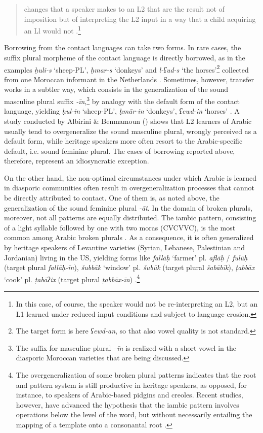 \documentclass[output=paper]{langsci/langscibook}
\begin{document}
\begin{quote}changes that a speaker makes to an L2 that are the result not of imposition but of interpreting the L2 input in a way that a child acquiring an Ll would not \citep[525]{Lucas2015}.\footnote{In this case, of course, the speaker would not be re-interpreting an L2, but an L1 learned under reduced input conditions and subject to language erosion.}\end{quote}

Borrowing from the contact languages can take two forms. In rare cases, the suffix plural morpheme of the contact language is directly borrowed, as in the examples \textit{ḥuli-s} ‘sheep-PL’, \textit{ḥmar-s} ‘donkeys’ and \textit{l-ʕud-s} ‘the horses’\footnote{The target form is here \textit{ʕewd-an}, so that also vowel quality is not standard.} collected from one Moroccan informant in the Netherlands \citep[274]{BoumansdeRuiter2002}. Sometimes, however, transfer works in a subtler way, which consists in the generalization of the sound masculine plural suffix \textit{{}-īn},\footnote{The suffix for masculine plural \textit{–īn} is realized with a short vowel in the diasporic Moroccan varieties that are being discussed.} by analogy with the default form of the contact language, yielding \textit{ḥul-in} ‘sheep-PL’, \textit{ḥmār-in} ‘donkeys’, \textit{ʕewd-in} ‘horses’ \citep[274]{BoumansdeRuiter2002}. A study conducted by Albirini \& Benmamoun (\citeyear[866–867]{AlbiriniBenmamoun2014}) shows that L2 learners of Arabic usually tend to overgeneralize the sound masculine plural, wrongly perceived as a default form, while heritage speakers more often resort to the Arabic-specific default, i.e. sound feminine plural. The cases of borrowing reported above, therefore, represent an idiosyncratic exception.

On the other hand, the non-optimal circumstances under which Arabic is learned in diasporic communities often result in overgeneralization processes that cannot be directly attributed to contact. One of them is, as noted above, the generalization of the sound feminine plural \textit{{}-āt}. In the domain of broken plurals, moreover, not all patterns are equally distributed. The iambic pattern, consisting of a light syllable followed by one with two moras (CVCVVC), is the most common among Arabic broken plurals \citep[857]{AlbiriniBenmamoun2014}. As a consequence, it is often generalized by heritage speakers of Levantine varieties (Syrian, Lebanese, Palestinian and Jordanian) living in the US, yielding forms like \textit{fallāḥ} ‘farmer’ pl. \textit{aflāḥ} / \textit{fulūḥ} (target plural \textit{fallāḥ-īn}), \textit{šubbāk} ‘window’ pl. \textit{šubūk} (target plural \textit{šabābīk}), \textit{ṭabbāx} ‘cook’ pl. \textit{ṭabāʔix} (target plural \textit{ṭabbāx-īn}) \citep[865]{AlbiriniBenmamoun2014}.\footnote{The overgeneralization of some broken plural patterns indicates that the root and pattern system is still productive in heritage speakers, as opposed, for instance, to speakers of Arabic-based pidgins and creoles. Recent studies, however, have advanced the hypothesis that the iambic pattern involves operations below the level of the word, but without necessarily entailing the mapping of a template onto a consonantal root \citep[112]{AlbiriniSaadah2014}.} 
\end{document}
